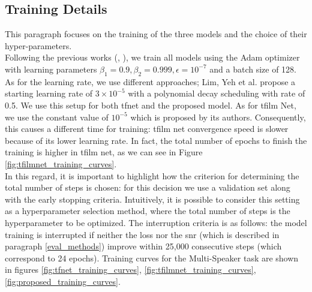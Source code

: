 \subsection{Training Details} \label{training_details}
This paragraph focuses on the training of the three models and the choice of their hyper-parameters. \\
Following the previous works (\cite{lim2018time}, \cite{birnbaum2019temporal}), we train all models using the Adam optimizer \cite{kingma2014adam} with learning parameters $\beta_1 = 0.9, \beta_2 = 0.999, \epsilon = 10^{-7}$ and a batch size of 128. \\
As for the learning rate, we use different approaches; Lim, Yeh et al.\cite{lim2018time} propose a starting learning rate of $3\times 10^{-5}$ with a polynomial decay scheduling with rate of 0.5. We use this setup for both \gls{tfnet} and the proposed model. As for \gls{tfilm} Net, we use the constant value of $10^{-5}$ which is proposed by its authors. Consequently, this causes a different time for training: \gls{tfilm} net convergence speed is slower because of its lower learning rate. In fact, the total number of epochs to finish the training is higher in \gls{tfilm} net, as we can see in Figure \ref{fig:tfilmnet_training_curves}. \\
In this regard, it is important to highlight how the criterion for determining the total number of steps is chosen: for this decision we use a validation set along with the early stopping criteria. Intuitively, it is possible to consider this setting as a hyperparameter selection method, where the total number of steps is the hyperparameter to be optimized. The interruption criteria is as follows: the model training is interrupted if neither the loss nor the \gls{snr} (which is described in paragraph \ref{eval_methods}) improve within 25,000 consecutive steps (which correspond to 24 epochs). Training curves for the Multi-Speaker task are shown in figures \ref{fig:tfnet_training_curves}, \ref{fig:tfilmnet_training_curves}, \ref{fig:proposed_training_curves}. \\

